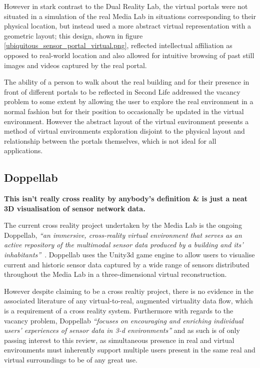 However in stark contrast to the Dual Reality Lab, the virtual portals were not situated in a simulation of the real Media Lab in situations corresponding to their physical location, but instead used a more abstract virtual representation with a geometric layout; this design, shown in figure \ref{ubiquitous_sensor_portal_virtual.png}, reflected intellectual affiliation as opposed to real-world location and also allowed for intuitive browsing of past still images and videos captured by the real portal.

The ability of a person to walk about the real building and for their presence in front of different portals to be reflected in Second Life addressed the vacancy problem to some extent by allowing the user to explore the real environment in a normal fashion but for their position to occasionally be updated in the virtual environment. However the abstract layout of the virtual environment presents a method of virtual environments exploration disjoint to the physical layout and relationship between the portals themselves, which is not ideal for all applications.

\subsection{Doppellab}
\label{subsec:doppellab}

\textbf{This isn't really cross reality by anybody's definition \& is just a neat 3D visualisation of sensor network data.}

The current cross reality project undertaken by the Media Lab is the ongoing Doppellab, \textit{``an immersive, cross-reality virtual environment that serves as an active repository of the multimodal sensor data produced by a building and its' inhabitants''}~\cite{Dublon2011, Dublon2011a}. Doppellab uses the Unity3d game engine to allow users to visualise current and historic sensor data captured by a wide range of sensors distributed throughout the Media Lab in a three-dimensional virtual reconstruction.

However despite claiming to be a cross realtiy project, there is no evidence in the associated literature of any virtual-to-real, augmented virtuality data flow, which is a requirement of a cross reality system. Furthermore with regards to the vacancy problem, Doppellab \textit{``focuses on encouraging and enriching individual users' experiences of sensor data in 3-d environments''} and as such is of only passing interest to this review, as simultaneous presence in real and virtual environments must inherently support multiple users present in the same real and virtual surroundings to be of any great use.

